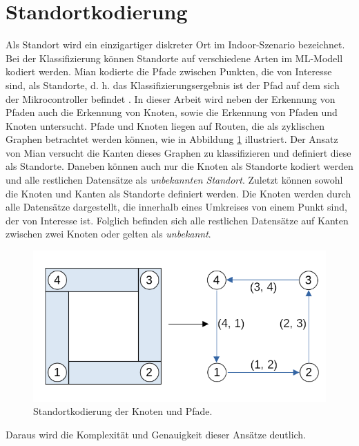 \section{Standortkodierung}
\label{sec:model_location_encoding}
Als Standort wird ein einzigartiger diskreter Ort im Indoor-Szenario bezeichnet.
Bei der Klassifizierung können Standorte auf verschiedene Arten im ML-Modell kodiert werden.
Mian kodierte die Pfade zwischen Punkten, die von Interesse sind, als Standorte,
d. h. das Klassifizierungsergebnis ist der Pfad auf dem sich der Mikrocontroller befindet \cite{naveedThesis}.
\newline
\newline
In dieser Arbeit wird neben der Erkennung von Pfaden auch die Erkennung von Knoten, sowie die Erkennung von Pfaden und Knoten untersucht.
Pfade und Knoten liegen auf Routen, die als zyklischen Graphen betrachtet werden können, wie in Abbildung \ref{fig:location_encoding} illustriert.
Der Ansatz von Mian versucht die Kanten dieses Graphen zu klassifizieren und definiert diese als Standorte.
Daneben können auch nur die Knoten als Standorte kodiert werden und alle restlichen Datensätze als \textit{unbekannten Standort}.
Zuletzt können sowohl die Knoten und Kanten als Standorte definiert werden.
Die Knoten werden durch alle Datensätze dargestellt, die innerhalb eines Umkreises von einem Punkt sind, der von Interesse ist.
Folglich befinden sich alle restlichen Datensätze auf Kanten zwischen zwei Knoten oder gelten als \textit{unbekannt}.
\begin{figure}[h!]
    \centering
    \includegraphics[width=\linewidth]{images/location_encoding.png}
    \caption{Standortkodierung der Knoten und Pfade.}
    \label{fig:location_encoding}
\end{figure}
\newline
Daraus wird die Komplexität und Genauigkeit dieser Ansätze deutlich.
